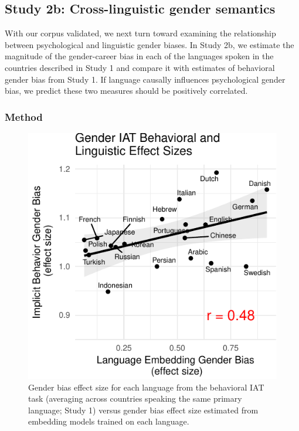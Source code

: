 \documentclass[10pt, letterpaper]{article}
\newenvironment{CodeChunk}{}{}
\begin{document}
\subsection{Study 2b: Cross-linguistic gender
semantics}\label{study-2b-cross-linguistic-gender-semantics}

With our corpus validated, we next turn toward examining the
relationship between psychological and linguistic gender biases. In
Study 2b, we estimate the magnitude of the gender-career bias in each of
the languages spoken in the countries described in Study 1 and compare
it with estimates of behavioral gender bias from Study 1. If language
causally influences psychological gender bias, we predict these two
measures should be positively correlated.

\subsubsection{Method}\label{method-2}

\begin{CodeChunk}
\begin{figure}[t]

{\centering \includegraphics{figs/behavior_vs_language_plot-1} 

}

\caption[Gender bias effect size for each language from the behavioral IAT task (averaging across countries speaking the same primary language]{Gender bias effect size for each language from the behavioral IAT task (averaging across countries speaking the same primary language; Study 1) versus gender bias effect size estimated from embedding models trained on each language.}\label{fig:behavior_vs_language_plot}
\end{figure}
\end{CodeChunk}
\end{document}
